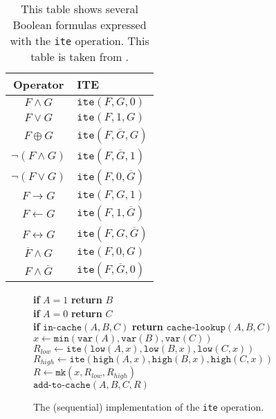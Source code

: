 \begin{table}[ht]
	\centering
	\begin{tabular}{| c | l |}
		\hline
		Operator & ITE \\ 
		\hline 
		$F \wedge G$ & $\texttt{ite}(F, G, 0)$ \\
		$F \vee G$ & $\texttt{ite}(F, 1, G)$ \\
		$F \oplus G$ & $\texttt{ite}(F, \overline G, G)$ \\
		$\neg (F \wedge G)$ & $\texttt{ite}(F, \overline G, 1)$ \\
		$\neg (F \vee G)$ & $\texttt{ite}(F, 0, \overline G)$ \\
		$F \rightarrow G$ & $\texttt{ite}(F, G, 1)$ \\
		$F \leftarrow G$ & $\texttt{ite}(F, 1, \overline G)$ \\
		$F \leftrightarrow G$ & $\texttt{ite}(F, G, \overline G)$ \\
		$\overline F \wedge G$ & $\texttt{ite}(F, 0, G)$ \\
		$F \wedge \overline G$ & $\texttt{ite}(F, \overline G, 0)$ \\
		\hline
	\end{tabular}
	\caption{This table shows several Boolean formulas expressed with the \texttt{ite} operation. This table is taken from \cite{dijk2012parallelization}.}
	\label{tab:ite}
\end{table}

\begin{figure}
	\centering
	\begin{algorithm}[H]
		\SetStartEndCondition{ }{}{}%
		\AlgoDontDisplayBlockMarkers\SetAlgoNoEnd\SetAlgoNoLine%

		 {
			\textbf{if} $A=1$ \textbf{return} $B$ \\
			\textbf{if} $A=0$ \textbf{return} $C$ \\
			\textbf{if} $\texttt{in-cache}(A, B, C)$ \textbf{return} $\texttt{cache-lookup}(A,B,C)$ \\
			$x \gets \texttt{min}(\texttt{var}(A), \texttt{var}(B), \texttt{var}(C))$ \\
			$R_{low} \gets \texttt{ite}(\texttt{low}(A, x), \texttt{low}(B, x), \texttt{low}(C, x))$ \\
			$R_{high} \gets \texttt{ite}(\texttt{high}(A, x), \texttt{high}(B, x), \texttt{high}(C, x))$ \\
			$R \gets \texttt{mk}(x, R_{low}, R_{high})$ \\
			$\texttt{add-to-cache}(A, B, C, R)$ \\
		}
	\end{algorithm}

	\caption{The (sequential) implementation of the \texttt{ite} operation.}
	\label{fig:ite_seq}
\end{figure}

